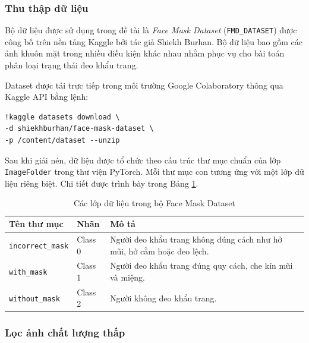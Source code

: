 \documentclass[a4paper,12pt]{article}
\begin{document}
\subsubsection{Thu thập dữ liệu}

Bộ dữ liệu được sử dụng trong đề tài là \textit{Face Mask Dataset} (\texttt{FMD\_DATASET}) được công bố trên nền tảng Kaggle bởi tác giả Shiekh Burhan. Bộ dữ liệu bao gồm các ảnh khuôn mặt trong nhiều điều kiện khác nhau nhằm phục vụ cho bài toán phân loại trạng thái đeo khẩu trang.

Dataset được tải trực tiếp trong môi trường Google Colaboratory thông qua Kaggle API bằng lệnh:

\begin{verbatim}
!kaggle datasets download \
-d shiekhburhan/face-mask-dataset \
-p /content/dataset --unzip
\end{verbatim}

Sau khi giải nén, dữ liệu được tổ chức theo cấu trúc thư mục chuẩn của lớp \texttt{ImageFolder} trong thư viện PyTorch. Mỗi thư mục con tương ứng với một lớp dữ liệu riêng biệt. Chi tiết được trình bày trong Bảng \ref{tab:dataset_classes}.

\begin{table}[H]
\centering
\caption{Các lớp dữ liệu trong bộ Face Mask Dataset}
\label{tab:dataset_classes}

\renewcommand{\arraystretch}{1.5}

\begin{tabularx}{\textwidth}
{|>{\raggedright\arraybackslash}p{4cm}
 |>{\centering\arraybackslash}p{2.5cm}
 |X|}
\hline

\rowcolor{headerblue}
\textbf{\color{white}Tên thư mục}
&
\textbf{\color{white}Nhãn}
&
\textbf{\color{white}Mô tả}
\\ \hline

\texttt{incorrect\_mask}
&
Class 0
&
Người đeo khẩu trang không đúng cách như hở mũi, hở cằm hoặc đeo lệch.
\\ \hline

\texttt{with\_mask}
&
Class 1
&
Người đeo khẩu trang đúng quy cách, che kín mũi và miệng.
\\ \hline

\texttt{without\_mask}
&
Class 2
&
Người không đeo khẩu trang.
\\ \hline

\end{tabularx}
\end{table}

\subsubsection{Lọc ảnh chất lượng thấp}
 
\end{document}
